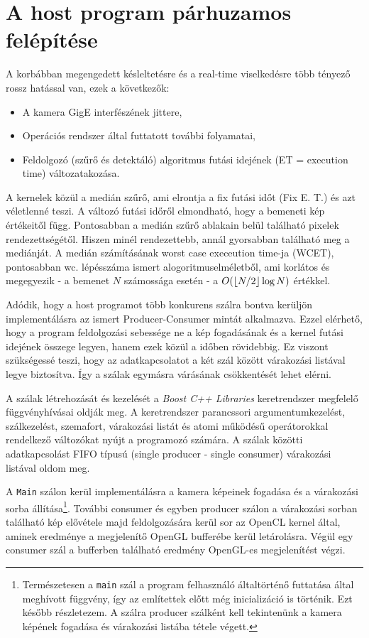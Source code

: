 \section{A host program párhuzamos felépítése} \label{sec:parallel}
	A korbábban megengedett késleltetésre és a real-time viselkedésre több tényező rossz hatással van, ezek a következők:
	\begin{itemize}[noitemsep]
	  \item A kamera GigE interfészének jittere,
	  \item Operációs rendszer által futtatott további folyamatai,
	  \item Feldolgozó (szűrő és detektáló) algoritmus futási idejének (ET = execution time) változatakozása. 
	\end{itemize}
	A kernelek közül a medián szűrő, ami elrontja a fix futási időt (Fix E. T.) és azt véletlenné teszi.
	A változó futási időről elmondható, hogy a bemeneti kép értékeitől függ. Pontosabban a medián szűrő ablakain belül található
	pixelek rendezettségétől. Hiszen minél rendezettebb, annál gyorsabban található meg a mediánját.
	A medián számításának worst case execeution time-ja (WCET), pontosabban wc. lépésszáma ismert alogoritmuselméletből, ami korlátos
	és megegyezik - a bemenet $N$ számossága esetén - a $O(\lfloor N/2\rfloor \log N)$ értékkel.
	
	Adódik, hogy a host programot több konkurens szálra bontva kerüljön implementálásra az ismert Producer-Consumer
	\cite{EWD:EWD329pub} mintát alkalmazva. Ezzel elérhető, hogy a program feldolgozási sebessége ne a kép fogadásának és a kernel
	futási idejének összege legyen, hanem ezek közül a időben rövidebbig.
	Ez viszont szükségessé teszi, hogy az adatkapcsolatot a két szál között várakozási listával legye biztosítva.
	Így a szálak egymásra várásának csökkentését lehet elérni.
	
	A szálak létrehozását és kezelését a \textit{Boost C++ Libraries} \cite{boost} keretrendszer
	megfelelő függvényhívásai oldják meg. A keretrendszer parancssori argumentumkezelést, szálkezelést, szemafort, várakozási
	listát és atomi működésű operátorokkal rendelkező változókat nyújt a programozó számára.
	A szálak közötti adatkapcsolást FIFO típusú (single producer - single consumer) várakozási listával oldom meg.
	
	A \texttt{Main} szálon kerül implementálásra a kamera képeinek fogadása és a várakozási sorba állítása\footnote{Természetesen a
	\texttt{main} szál a program felhasználó általtörténő futtatása által meghívott függvény, így az említettek előtt még inicializáció is történik. Ezt később részletezem. A szálra producer szálként kell tekintenünk a kamera képének fogadása és
	várakozási listába tétele végett.}.
	További consumer és egyben producer szálon a várakozási sorban található kép elővétele majd feldolgozására kerül sor az
	OpenCL kernel által, aminek eredménye a megjelenítő OpenGL bufferébe kerül letárolásra.
	Végül egy consumer szál a bufferben található eredmény OpenGL-es megjelenítést végzi.
	
